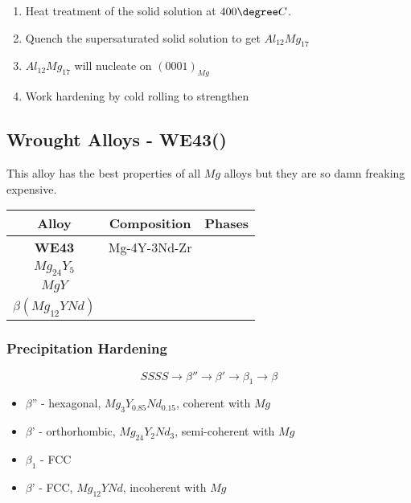\begin{enumerate}
  \item Heat treatment of the solid solution at $400\degree C$.
  \item Quench the supersaturated solid solution to get $Al_{12}Mg_{17}$
  \item $Al_{12}Mg_{17}$ will nucleate on  $(0001)_{Mg}$
  \item Work hardening by cold rolling to strengthen
\end{enumerate}

\subsection{Wrought Alloys - WE43()} %
\label{sub:we_alloys_}
This alloy has the best properties of all $Mg$ alloys but they are so damn freaking expensive.

\begin{table}[H]
\centering
{\renewcommand{\arraystretch}{2}
\begin{tabular}{|c|c|c|}
\hline
\textbf{Alloy} & \textbf{Composition} & \textbf{Phases} \\ \hline
\textbf{WE43}   & Mg-4Y-3Nd-Zr   & \pbox{20cm}{$Mg_{41}Nd_5$\\ $Mg_{24}Y_5$ \\ $MgY$ \\ $\beta (Mg_{12}YNd)$} \\ \hline
\end{tabular}}
\end{table}

\subsubsection{Precipitation Hardening} %
\label{ssub:precipitation_hardening}

\begin{equation}
  SSSS \rightarrow \beta'' \rightarrow \beta' \rightarrow \beta_1 \rightarrow \beta
\end{equation}

\begin{itemize}
  \item $\beta$'' - hexagonal, $Mg_3Y_{0.85}Nd_{0.15}$, coherent with $Mg$
  \item $\beta$' - orthorhombic, $Mg_{24}Y_{2}Nd_{3}$, semi-coherent with $Mg$
  \item $\beta_1$ - FCC
  \item $\beta$' - FCC, $Mg_{12}YNd$, incoherent with $Mg$
\end{itemize}

